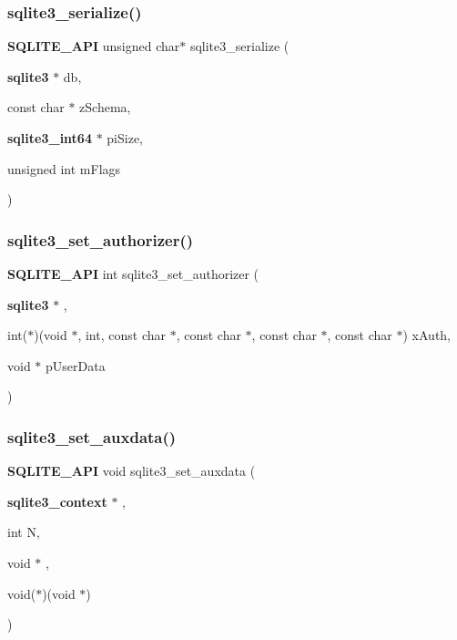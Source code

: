 \mbox{\label{sqlite3_8h_a0776e20a40a2ce252300c8417595ce79}} 
\subsubsection{sqlite3\_serialize()}
{\footnotesize\ttfamily \textbf{ S\+Q\+L\+I\+T\+E\+\_\+\+A\+PI} unsigned char$\ast$ sqlite3\+\_\+serialize (\begin{DoxyParamCaption}\item[{\textbf{ sqlite3} $\ast$}]{db,  }\item[{const char $\ast$}]{z\+Schema,  }\item[{\textbf{ sqlite3\+\_\+int64} $\ast$}]{pi\+Size,  }\item[{unsigned int}]{m\+Flags }\end{DoxyParamCaption})}

\mbox{\label{sqlite3_8h_a7191abef3b5c8286e8e7b590f93ec720}} 
\subsubsection{sqlite3\_set\_authorizer()}
{\footnotesize\ttfamily \textbf{ S\+Q\+L\+I\+T\+E\+\_\+\+A\+PI} int sqlite3\+\_\+set\+\_\+authorizer (\begin{DoxyParamCaption}\item[{\textbf{ sqlite3} $\ast$}]{,  }\item[{int($\ast$)(void $\ast$, int, const char $\ast$, const char $\ast$, const char $\ast$, const char $\ast$)}]{x\+Auth,  }\item[{void $\ast$}]{p\+User\+Data }\end{DoxyParamCaption})}

\mbox{\label{sqlite3_8h_a6398b2ceb5756250992de2be9dea6c2a}} 
\subsubsection{sqlite3\_set\_auxdata()}
{\footnotesize\ttfamily \textbf{ S\+Q\+L\+I\+T\+E\+\_\+\+A\+PI} void sqlite3\+\_\+set\+\_\+auxdata (\begin{DoxyParamCaption}\item[{\textbf{ sqlite3\+\_\+context} $\ast$}]{,  }\item[{int}]{N,  }\item[{void $\ast$}]{,  }\item[{void($\ast$)(void $\ast$)}]{ }\end{DoxyParamCaption})}

